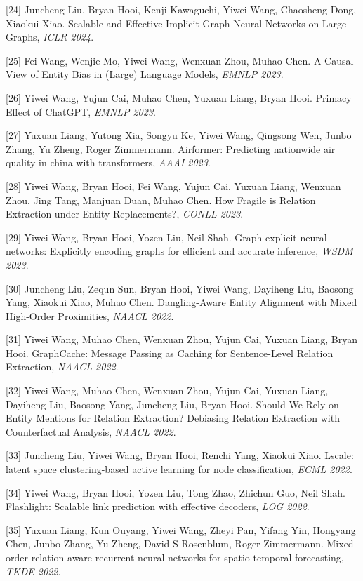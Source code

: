 [24] Juncheng Liu, Bryan Hooi, Kenji Kawaguchi, Yiwei Wang, Chaosheng Dong, Xiaokui Xiao. Scalable and Effective Implicit Graph Neural Networks on Large Graphs, \textit{ICLR 2024}.

[25] Fei Wang, Wenjie Mo, Yiwei Wang, Wenxuan Zhou, Muhao Chen. A Causal View of Entity Bias in (Large) Language Models, \textit{EMNLP 2023}.

[26] Yiwei Wang, Yujun Cai, Muhao Chen, Yuxuan Liang, Bryan Hooi. Primacy Effect of ChatGPT, \textit{EMNLP 2023}.

[27] Yuxuan Liang, Yutong Xia, Songyu Ke, Yiwei Wang, Qingsong Wen, Junbo Zhang, Yu Zheng, Roger Zimmermann. Airformer: Predicting nationwide air quality in china with transformers, \textit{AAAI 2023}.

[28] Yiwei Wang, Bryan Hooi, Fei Wang, Yujun Cai, Yuxuan Liang, Wenxuan Zhou, Jing Tang, Manjuan Duan, Muhao Chen. How Fragile is Relation Extraction under Entity Replacements?, \textit{CONLL 2023}.

[29] Yiwei Wang, Bryan Hooi, Yozen Liu, Neil Shah. Graph explicit neural networks: Explicitly encoding graphs for efficient and accurate inference, \textit{WSDM 2023}.

[30] Juncheng Liu, Zequn Sun, Bryan Hooi, Yiwei Wang, Dayiheng Liu, Baosong Yang, Xiaokui Xiao, Muhao Chen. Dangling-Aware Entity Alignment with Mixed High-Order Proximities, \textit{NAACL 2022}.

[31] Yiwei Wang, Muhao Chen, Wenxuan Zhou, Yujun Cai, Yuxuan Liang, Bryan Hooi. GraphCache: Message Passing as Caching for Sentence-Level Relation Extraction, \textit{NAACL 2022}.

[32] Yiwei Wang, Muhao Chen, Wenxuan Zhou, Yujun Cai, Yuxuan Liang, Dayiheng Liu, Baosong Yang, Juncheng Liu, Bryan Hooi. Should We Rely on Entity Mentions for Relation Extraction? Debiasing Relation Extraction with Counterfactual Analysis, \textit{NAACL 2022}.

[33] Juncheng Liu, Yiwei Wang, Bryan Hooi, Renchi Yang, Xiaokui Xiao. Lscale: latent space clustering-based active learning for node classification, \textit{ECML 2022}.

[34] Yiwei Wang, Bryan Hooi, Yozen Liu, Tong Zhao, Zhichun Guo, Neil Shah. Flashlight: Scalable link prediction with effective decoders, \textit{LOG 2022}.

[35] Yuxuan Liang, Kun Ouyang, Yiwei Wang, Zheyi Pan, Yifang Yin, Hongyang Chen, Junbo Zhang, Yu Zheng, David S Rosenblum, Roger Zimmermann. Mixed-order relation-aware recurrent neural networks for spatio-temporal forecasting, \textit{TKDE 2022}.

